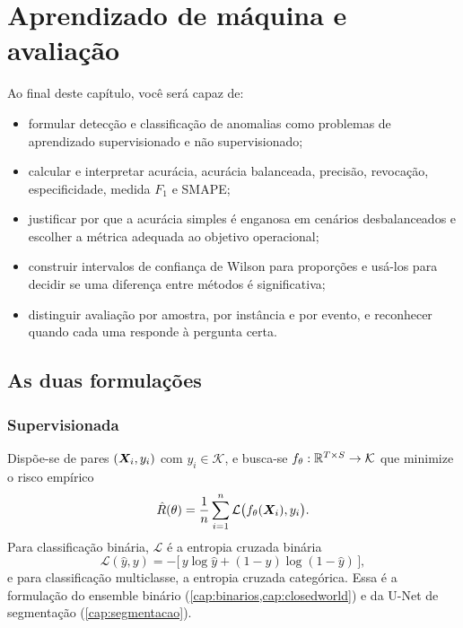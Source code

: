 \chapter{Aprendizado de máquina e avaliação}
\label{cap:aprendizado}

\begin{objetivos}
Ao final deste capítulo, você será capaz de:
\begin{itemize}[leftmargin=*,itemsep=0.2em]
  \item formular detecção e classificação de anomalias como problemas de aprendizado
        supervisionado e não supervisionado;
  \item calcular e interpretar acurácia, acurácia balanceada, precisão, revocação,
        especificidade, medida $F_1$ e SMAPE;
  \item justificar por que a acurácia simples é enganosa em cenários desbalanceados e
        escolher a métrica adequada ao objetivo operacional;
  \item construir intervalos de confiança de Wilson para proporções e usá-los para
        decidir se uma diferença entre métodos é significativa;
  \item distinguir avaliação por amostra, por instância e por evento, e reconhecer
        quando cada uma responde à pergunta certa.
\end{itemize}
\end{objetivos}

\section{As duas formulações}

\subsection{Supervisionada}

Dispõe-se de pares $(\bm{X}_i, y_i)$ com $y_i \in \mathcal{K}$, e busca-se
$f_{\theta} : \mathbb{R}^{T \times S} \to \mathcal{K}$ que minimize o risco empírico
\[
  \hat{R}(\theta) = \frac{1}{n} \sum_{i=1}^{n} \mathcal{L}\big(f_{\theta}(\bm{X}_i), y_i\big).
\]
Para classificação binária, $\mathcal{L}$ é a entropia cruzada binária
\[
  \mathcal{L}(\hat{y}, y) = -\big[\, y \log \hat{y} + (1-y)\log(1-\hat{y}) \,\big],
\]
e para classificação multiclasse, a entropia cruzada categórica. Essa é a formulação do
ensemble binário (\cref{cap:binarios,cap:closedworld}) e da U-Net de segmentação
(\cref{cap:segmentacao}).

